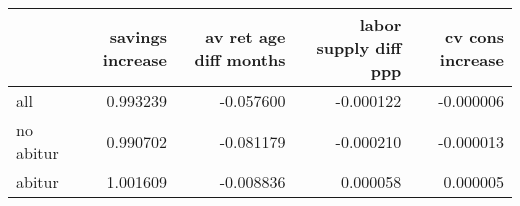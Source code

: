 \begin{tabular}{lrrrr}
\toprule
 & savings increase & av ret age diff months & labor supply diff ppp & cv cons increase \\
\midrule
all & 0.993239 & -0.057600 & -0.000122 & -0.000006 \\
no abitur & 0.990702 & -0.081179 & -0.000210 & -0.000013 \\
abitur & 1.001609 & -0.008836 & 0.000058 & 0.000005 \\
\bottomrule
\end{tabular}
